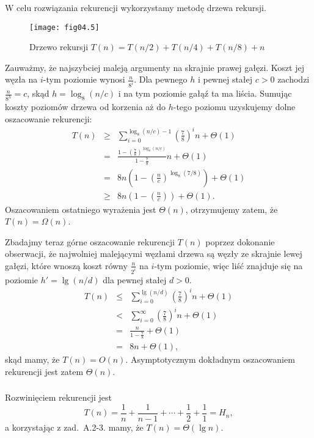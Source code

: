 \subsubsection{} %
W celu rozwiązania rekurencji wykorzystamy metodę drzewa rekursji.
\begin{figure}[h]
	\begin{center}
		\texttt{[image: fig04.5]}
	\end{center}
	\caption{Drzewo rekursji $T(n)=T(n/2)+T(n/4)+T(n/8)+n$} \label{fig:4-4f}
\end{figure}
Zauważmy, że najszybciej maleją argumenty na skrajnie prawej gałęzi. Koszt jej węzła na $i$-tym poziomie wynosi $\frac{n}{8^i}$. Dla pewnego $h$ i pewnej stałej $c>0$ zachodzi $\frac{n}{8^h}=c$, skąd $h=\log_8(n/c)$ i na tym poziomie gałąź ta ma liścia. Sumując koszty poziomów drzewa od korzenia aż do $h$-tego poziomu uzyskujemy dolne oszacowanie rekurencji:
\begin{eqnarray*}
	T(n) &\ge& \sum_{i=0}^{\log_8(n/c)-1}\left(\frac{7}{8}\right)^in+\Theta(1) \\
	&=& \frac{1-\left(\frac{7}{8}\right)^{\log_8(n/c)}}{1-\frac{7}{8}}n+\Theta(1) \\
	&=& 8n\left(1-\left(\frac{n}{c}\right)^{\log_8(7/8)}\right)+\Theta(1) \\
	&\ge& 8n\left(1-\left(\frac{n}{c}\right)\right)+\Theta(1).
\end{eqnarray*}
Oszacowaniem ostatniego wyrażenia jest $\Theta(n)$, otrzymujemy zatem, że $T(n)=\Omega(n)$.

Zbadajmy teraz górne oszacowanie rekurencji $T(n)$ poprzez dokonanie obserwacji, że najwolniej malejącymi węzłami drzewa są węzły ze skrajnie lewej gałęzi, które wnoszą koszt równy $\frac{n}{2^i}$ na $i$-tym poziomie, więc liść znajduje się na poziomie $h'=\lg(n/d)$ dla pewnej stałej $d>0$.
\begin{eqnarray*}
	T(n) &\le& \sum_{i=0}^{\lg(n/d)}\left(\frac{7}{8}\right)^in+\Theta(1) \\
	&<& \sum_{i=0}^\infty\left(\frac{7}{8}\right)^in+\Theta(1) \\
	&=& \frac{n}{1-\frac{7}{8}}+\Theta(1) \\
	&=& 8n+\Theta(1),
\end{eqnarray*}
skąd mamy, że $T(n)=O(n)$. Asymptotycznym dokładnym oszacowaniem rekurencji jest zatem $\Theta(n)$.

\subsubsection{} %
Rozwinięciem rekurencji jest
\[
	T(n) = \frac{1}{n}+\frac{1}{n-1}+\cdots+\frac{1}{2}+\frac{1}{1} = H_n,
\]
a korzystając z zad.~A.2-3. mamy, że $T(n)=\Theta(\lg n)$.

